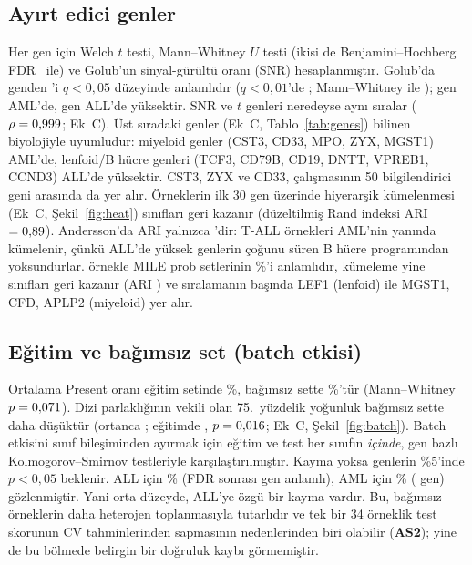\documentclass[conference]{IEEEtran}
\newcommand{\figref}[1]{Şekil~\ref{#1}}
\newcommand{\tabref}[1]{Tablo~\ref{#1}}
\newcommand{\AS}[1]{\textbf{AS#1}}
\begin{document}
\subsection{Ayırt edici genler}
Her gen için Welch $t$ testi, Mann--Whitney $U$ testi (ikisi de Benjamini--Hochberg FDR~\cite{benjamini1995}
ile) ve Golub'un sinyal-gürültü oranı (SNR) hesaplanmıştır. Golub'da \GolubFilt{} genden \GolubSig'i
$q<0{,}05$ düzeyinde anlamlıdır ($q<0{,}01$'de \GolubSigOne; Mann--Whitney ile \GolubSigMWU);
\GolubUpAML{} gen AML'de, \GolubUpALL{} gen ALL'de yüksektir. SNR ve $t$ genleri neredeyse aynı
sıralar ($\rho=0{,}999$; Ek~C). Üst sıradaki genler (Ek~C, \tabref{tab:genes}) bilinen biyolojiyle
uyumludur: miyeloid genler (CST3, CD33, MPO, ZYX, MGST1) AML'de, lenfoid/B hücre genleri (TCF3, CD79B,
CD19, DNTT, VPREB1, CCND3) ALL'de yüksektir. CST3, ZYX ve CD33, \cite{golub1999} çalışmasının 50
bilgilendirici geni arasında da yer alır. Örneklerin ilk 30 gen üzerinde hiyerarşik kümelenmesi
(Ek~C, \figref{fig:heat}) sınıfları geri kazanır (düzeltilmiş Rand indeksi ARI $=0{,}89$). Andersson'da
ARI yalnızca \AndARI{}'dir: T-ALL örnekleri AML'nin yanında kümelenir, çünkü ALL'de yüksek genlerin
çoğunu süren B hücre programından yoksundurlar. \MileN{} örnekle MILE prob setlerinin \%\MileSigPct'i
anlamlıdır, kümeleme yine sınıfları geri kazanır (ARI \MileARI) ve sıralamanın başında LEF1 (lenfoid)
ile MGST1, CFD, APLP2 (miyeloid) yer alır.



\subsection{Eğitim ve bağımsız set (batch etkisi)}
Ortalama Present oranı eğitim setinde \%\GolubPresTrain, bağımsız sette \%\GolubPresTest'tür
(Mann--Whitney $p=0{,}071$). Dizi parlaklığının vekili olan 75.\ yüzdelik yoğunluk bağımsız sette
daha düşüktür (ortanca \GolubQTest{}; eğitimde \GolubQTrain, $p=0{,}016$; Ek~C, \figref{fig:batch}).
Batch etkisini sınıf bileşiminden ayırmak için eğitim ve test her sınıfın \emph{içinde}, gen bazlı
Kolmogorov--Smirnov testleriyle karşılaştırılmıştır. Kayma yoksa genlerin \%5'inde $p<0{,}05$ beklenir.
ALL için \%\GolubKSAll{} (FDR sonrası \GolubKSqAll{} gen anlamlı), AML için \%\GolubKSAml{}
(\GolubKSqAml{} gen) gözlenmiştir. Yani orta düzeyde, ALL'ye özgü bir kayma vardır. Bu, bağımsız
örneklerin daha heterojen toplanmasıyla tutarlıdır ve tek bir 34 örneklik test skorunun CV
tahminlerinden sapmasının nedenlerinden biri olabilir (\AS{2}); yine de \cite{dudoit2002} bu bölmede
belirgin bir doğruluk kaybı görmemiştir.
\end{document}
